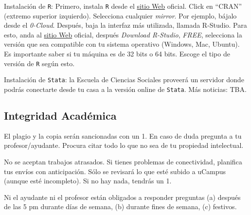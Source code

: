 \documentclass[letterpaper]{article}
\renewenvironment{itemize}{
  \begin{list}{}{
    \setlength{\leftmargin}{1.5em}
  }
}{
  \end{list}
}
\begin{document}
\begin{itemize}
  
  \item[$\circ$] Instalaci\'on de \texttt{R}: Primero, instala \texttt{R} desde el \href{https://www.r-project.org/}{sitio Web} oficial. Click en ``CRAN'' (extremo superior izquierdo). Selecciona cualquier \emph{mirror}. Por ejemplo, b\'ajalo desde el \emph{0-Cloud}. Despu\'es, baja la interfaz m\'as utilizada, llamada R-Studio. Para esto, anda al \href{https://www.rstudio.com}{sitio Web} oficial, despu\'es \emph{Download R-Studio}, \emph{FREE}, selecciona la versi\'on que sea compatible con tu sistema operativo (Windows, Mac, Ubuntu). Es importante saber si tu m\'aquina es de 32 bits o 64 bits. Escoge el tipo de versi\'on de \texttt{R} seg\'un esto.

  \item[$\circ$] Instalaci\'on de \texttt{Stata}: la Escuela de Ciencias Sociales proveer\'a un servidor donde podr\'as conectarte desde tu casa a la versi\'on online de \texttt{Stata}. M\'as noticias: TBA.
\end{itemize}




\subsection*{Integridad Acad\'emica}


\begin{itemize}
	\item[$\circ$] El plagio y la copia ser\'an sancionadas con un 1. En caso de duda pregunta a tu profesor/ayudante. Procura citar todo lo que no sea de tu propiedad intelectual.
	\item[$\circ$] No se aceptan trabajos atrasados. Si tienes problemas de conectividad, planifica tus env\'ios con anticipaci\'on. S\'olo se revisar\'a lo que est\'e subido a uCampus (aunque est\'e incompleto). Si no hay nada, tendr\'as un 1.
	\item[$\circ$] Ni el ayudante ni el profesor est\'an obligados a responder preguntas (a) despu\'es de las 5 pm durante d\'ias de semana, (b) durante fines de semana, (c) festivos.
\end{itemize}
\end{document}
